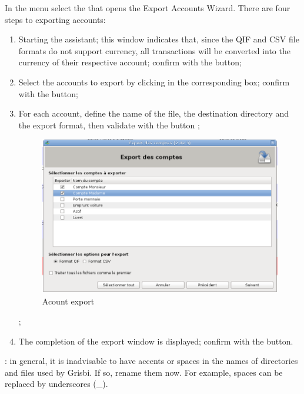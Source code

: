 In the  menu select the  that opens the Export Accounts Wizard. There are four steps to exporting accounts:

\begin{enumerate}
	\item Starting the assistant; this window indicates that, since the QIF and CSV file formats do not support currency, all transactions will be converted into the currency of their respective account; confirm with the  button;
	\item Select the accounts to export by clicking in the corresponding box; confirm with the   button;
	\item For each account, define the name of the file, the destination directory and the export format, then validate with the  button \ifIllustration {} ;
	\begin{figure}[t]
	\begin{center}
	\includegraphics[scale=0.5]{image/screenshot/QIF_export}
	\end{center}
	\caption{Acount export}
	\label{QIF-export-img}
	\end{figure}
	\else  ;
	\fi
	
	\item The completion of the export window is displayed; confirm with the  button.
\end{enumerate}

: in general, it is inadvisable to have accents or spaces in the names of directories and files used by Grisbi. If so, rename them now. For example, spaces can be replaced by underscores (\_).











